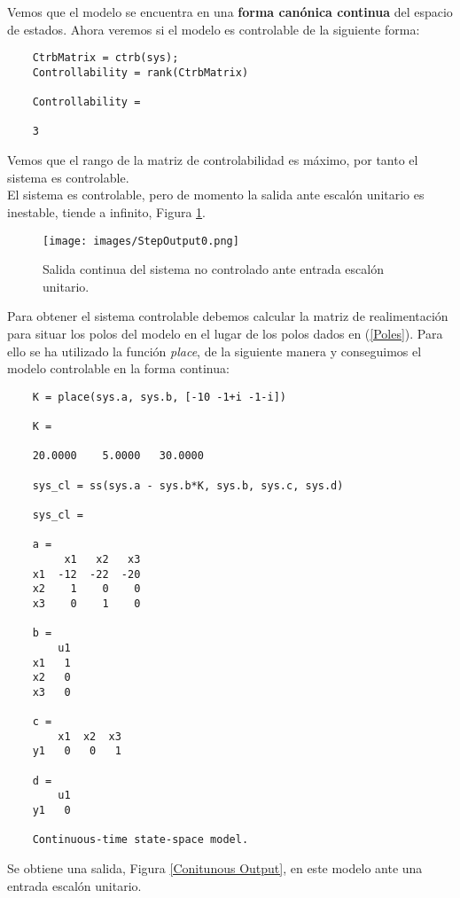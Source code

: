 \documentclass[a4paper, fontsize=11pt]{scrartcl} %
\numberwithin{equation}{section} %
\numberwithin{figure}{section} %
\numberwithin{table}{section} %
\begin{document}
	Vemos que el modelo se encuentra en una \textbf{forma canónica continua} del espacio de estados. Ahora veremos si el modelo es controlable de la siguiente forma:
	
	\begin{lstlisting}
	CtrbMatrix = ctrb(sys);
	Controllability = rank(CtrbMatrix)
	
	Controllability =
	
	3
	\end{lstlisting}
	
	Vemos que el rango de la matriz de controlabilidad es máximo, por tanto el sistema es controlable.\\
	
	El sistema es controlable, pero de momento la salida ante escalón unitario es inestable, tiende a infinito, Figura \ref{Conitunous Output 0}.
	
	\begin{figure}[h!]
		\centering
		\texttt{[image: images/StepOutput0.png]}
		\caption{Salida continua del sistema no controlado ante entrada escalón unitario.}
		\label{Conitunous Output 0}
	\end{figure}
	\FloatBarrier
	
	Para obtener el sistema controlable debemos calcular la matriz de realimentación para situar los polos del modelo en el lugar de los polos dados en (\ref{Poles}). Para ello se ha utilizado la función \textit{place}, de la siguiente manera y conseguimos el modelo controlable en la forma continua:\\
	
	\begin{lstlisting}
	K = place(sys.a, sys.b, [-10 -1+i -1-i])
	
	K =
	
	20.0000    5.0000   30.0000
	
	sys_cl = ss(sys.a - sys.b*K, sys.b, sys.c, sys.d)
	
	sys_cl =
	
	a = 
 	     x1   x2   x3
	x1  -12  -22  -20
	x2    1    0    0
	x3    0    1    0
	
	b = 
	    u1
	x1   1
	x2   0
	x3   0
	
	c = 
	    x1  x2  x3
	y1   0   0   1
	
	d = 
	    u1
	y1   0
	
	Continuous-time state-space model.
	\end{lstlisting}
	
	
	Se obtiene una salida, Figura \ref{Conitunous Output}, en este modelo ante una entrada escalón unitario.\\
	
\end{document}

